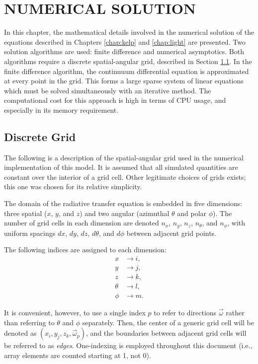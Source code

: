 \chapter{NUMERICAL SOLUTION}
\label{chap:numerical}
In this chapter, the mathematical details involved in the numerical solution of the equations described in Chapters \ref{chap:kelp} and \ref{chap:light} are presented.
Two solution algorithms are used: finite difference and numerical asymptotics.
Both algorithms require a discrete spatial-angular grid, described in Section \ref{sec:grid}.
In the finite difference algorithm, the continuuum differential equation is approximated at every point in the grid.
This forms a large sparse system of linear equations which must be solved simultaneously with an iterative method.
The computational cost for this approach is high in terms of CPU usage, and especially in its memory requirement.

\section{Discrete Grid}
\label{sec:grid}

The following is a description of the spatial-angular grid used in the numerical implementation of this model.
It is assumed that all simulated quantities are constant over the interior of a grid cell.
Other legitimate choices of grids exists; this one was chosen for its relative simplicity.

The domain of the radiative transfer equation is embedded in five dimensions: three spatial ($x$, $y$, and $z$) and two angular (azimuthal $\theta$ and polar $\phi$).
The number of grid cells in each dimension are denoted $n_x$, $n_y$, $n_z$,
$n_\theta$, and $n_\phi$, with uniform spacings $dx$, $dy$, $dz$, $d\theta$, and
$d\phi$ between adjacent grid points.

The following indices are assigned to each dimension:
\begin{align*}
  x &\to i, \\
  y &\to j, \\
  z &\to k, \\
  \theta &\to l, \\
  \phi &\to m.
\end{align*}

It is convenient, however, to use a single index $p$ to refer to directions $\vec{\omega}$ rather than referring to $\theta$ and $\phi$ separately.
Then, the center of a generic grid cell will be denoted as
$(x_i, y_j, z_k, \vec{\omega}_p)$, and the boundaries between adjacent grid cells
will be referred to as \textit{edges}.
One-indexing is employed throughout this document (i.e., array elements are counted starting at 1, not 0).

